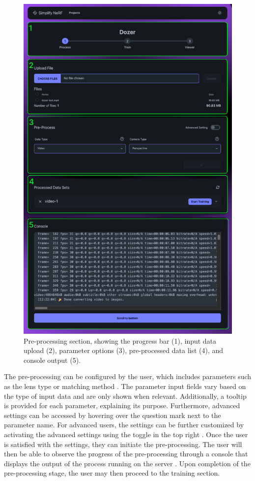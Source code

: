 \begin{figure}[h!]
  \centering
  \includegraphics[width=.65\textwidth]{figures/view-process.png}
  \caption{Pre-processing section, showing the progress bar (1), input data upload (2), parameter options (3), pre-processed data list (4), and console output (5).}
  \label{fig:design:input-section}
\end{figure}

The pre-processing can be configured by the user, which includes parameters such as the lens type or matching method .
The parameter input fields vary based on the type of input data and are only shown when relevant. 
Additionally, a tooltip is provided for each parameter, explaining its purpose. 
Furthermore, advanced settings can be accessed by hovering over the question mark next to the parameter name.
For advanced users, the settings can be further customized by activating the advanced settings using the toggle in the top right .
Once the user is satisfied with the settings, they can initiate the pre-processing. The user will then be able to observe the progress of the pre-processing through a console that displays the output of the process running on the server .
Upon completion of the pre-processing stage, the user may then proceed to the training section.


